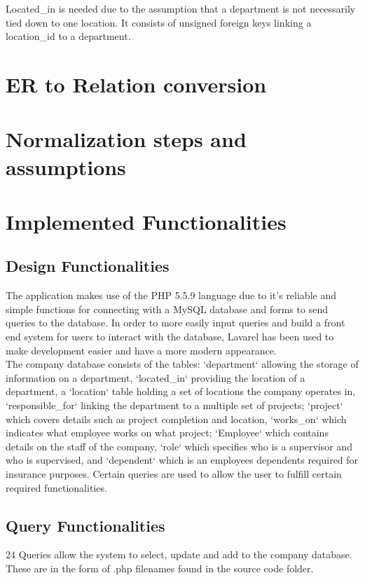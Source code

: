 \documentclass[11pt,letterpaper]{article}
\begin{document}
Located\_in is needed due to the assumption that a department is not necessarily tied down to one location. It consists of unsigned foreign keys linking a location\_id to a department.

	\section{ER to Relation conversion }

\section {Normalization steps and assumptions}

\section{Implemented Functionalities}
	\subsection{Design Functionalities}
	The application makes use of the PHP 5.5.9 language due to it's reliable and simple functions for connecting with a MySQL database and forms to send queries to the database. In order to more easily input queries and build a front end system for users to interact with the database, Lavarel has been used to make development easier and have a more modern appearance.\\
	
	The company database consists of the tables: `department` allowing the storage of information on a department, `located\_in` providing the location of a department, a `location` table holding a set of locations the company operates in, `responsible\_for` linking the department to a multiple set of projects; `project` which covers details such as project completion and location, `works\_on` which indicates what employee works on what project; `Employee` which contains details on the staff of the company, `role` which specifies who is a supervisor and who is supervised, and `dependent` which is an employees dependents required for insurance purposes.
	Certain queries are used to allow the user to fulfill certain required functionalities.\\
	
	\subsection{Query Functionalities}
	24 Queries allow the system to select, update and add to the company database. These are in the form of .php filenames found in the source code folder.
\end{document}
